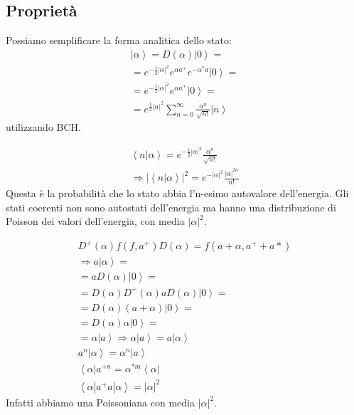 \subsection{Proprietà} %
Possiamo semplificare la forma analitica dello stato:
\begin{equation}\begin{split}
\left |\alpha \right\rangle=D\left(\alpha\right)\left |0 \right\rangle=\\
=e^{-\frac{1}{2}|\alpha|^2}e^{\alpha a^+}e^{-\alpha^*a}\left |0 \right\rangle=\\
=e^{-\frac{1}{2}|\alpha|^2}e^{\alpha a^+}\left |0 \right\rangle=\\
=e^{\frac{1}{2}|\alpha|^2}\sum_{n=0}^{\infty }{\frac{\alpha^n}{\sqrt{n!}}\left |n \right\rangle}
\end{split}\end{equation}
utilizzando BCH.

\begin{equation}\begin{split}
\left\langle n|\alpha \right\rangle=e^{-\frac{1}{2}|\alpha|^2}\frac{\alpha^n}{\sqrt{n!}} \\
\Longrightarrow \left|\left\langle n|\alpha \right\rangle \right|^2=e^{-|\alpha|^2}\frac{|\alpha|^{2n}}{n!}
\end{split}\end{equation}
Questa è la probabilità che lo stato abbia l'n-esimo autovalore dell'energia.
Gli stati coerenti non sono autostati dell'energia ma hanno una distribuzione di Poisson dei valori dell'energia, con media $|\alpha|^2$.

\begin{equation}\begin{split}
D^+\left(\alpha\right)f\left(f,a^+\right)D\left(\alpha\right)=f\left(a+\alpha,a^++a*\right)\\
\Longrightarrow a\left |\alpha \right\rangle=\\
=aD\left(\alpha\right)\left |0 \right\rangle=\\
=D\left(\alpha\right)D^+\left(\alpha\right)aD\left(\alpha\right)\left |0 \right\rangle=\\
=D\left(\alpha\right)\left(a+\alpha\right)\left |0 \right\rangle=\\
=D\left(\alpha\right)\alpha\left |0 \right\rangle=\\
=\alpha\left |a \right\rangle
\Longrightarrow \alpha\left |a \right\rangle=a\left |\alpha \right\rangle\\
a^n\left |\alpha \right\rangle=\alpha^n\left |a \right\rangle\\
\left\langle \alpha\right |a^{+n}=\alpha^{*m}\left\langle \alpha\right |\\
\left\langle \alpha|a^+a|\alpha \right\rangle=|\alpha|^2
\end{split}\end{equation}
Infatti abbiamo una Poissoniana con media  $|\alpha|^2$.

